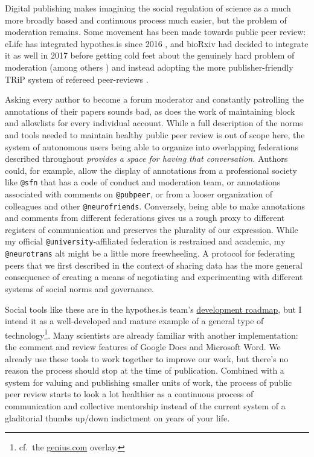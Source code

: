 \documentclass[10pt]{tufte-book}
\begin{document}
Digital publishing makes imagining the social regulation of science as a
much more broadly based and continuous process much easier, but the
problem of moderation remains. Some movement has been made towards
public peer review: eLife has integrated hypothes.is since 2016 \citep{ELifePartnersHypothes2016} , and bioRxiv had decided to
integrate it as well in 2017 \citep{dwhlyBioRxivSelectsHypothesis2017}  before getting cold feet about the genuinely hard problem of
moderation (among others \citep{heatherstainesPreprintServicesGather2018} ) and instead adopting the
more publisher-friendly TRiP system of refereed peer-reviews \citep{nateangellAnnouncingTRiPTransparent2019} .

Asking every author to become a forum moderator and constantly
patrolling the annotations of their papers sounds bad, as does the work
of maintaining block and allowlists for every individual account. While
a full description of the norms and tools needed to maintain healthy
public peer review is out of scope here, the system of autonomous users
being able to organize into overlapping federations described throughout
\emph{provides a space for having that conversation.} Authors could, for
example, allow the display of annotations from a professional society
like \texttt{@sfn} that has a code of conduct and moderation team, or
annotations associated with comments on \texttt{@pubpeer}, or from a
looser organization of colleagues and other \texttt{@neurofriends}.
Conversely, being able to make annotations and comments from different
federations gives us a rough proxy to different registers of
communication and preserves the plurality of our expression. While my
official \texttt{@university}-affiliated federation is restrained and
academic, my \texttt{@neurotrans} alt might be a little more
freewheeling. A protocol for federating peers that we first described in
the context of sharing data has the more general consequence of creating
a means of negotiating and experimenting with different systems of
social norms and governance.

Social tools like these are in the hypothes.is team's
\href{https://web.archive.org/web/20211015213849/https://github.com/hypothesis/product-backlog/projects/6}{development
roadmap}, but I intend it as a well-developed and mature example of a
general type of technology\footnote{cf.~the
  \href{https://genius.com}{genius.com} overlay.}. Many scientists are
already familiar with another implementation: the comment and review
features of Google Docs and Microsoft Word. We already use these tools
to work together to improve our work, but there's no reason the process
should stop at the time of publication. Combined with a system for
valuing and publishing smaller units of work, the process of public peer
review starts to look a lot healthier as a continuous process of
communication and collective mentorship instead of the current system of
a gladitorial thumbs up/down indictment on years of your life.
\end{document}
